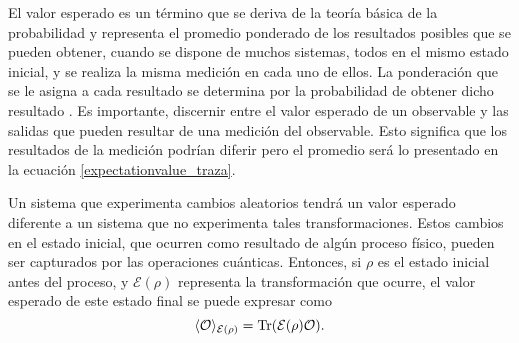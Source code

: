El valor esperado es un término que se deriva de la teoría básica de la probabilidad y representa el promedio ponderado de los resultados posibles que se pueden obtener, cuando se dispone de muchos sistemas, todos en el mismo estado inicial, y se realiza la misma medición en cada uno de ellos. La ponderación que se le asigna a cada resultado se determina por la probabilidad de obtener dicho resultado {\cite{gomez2010introduccion,sakurai2017modern}}.
Es importante, discernir entre el valor esperado de un observable y las salidas que pueden resultar de una medición del observable. Esto significa que los resultados de la medición podrían diferir pero el promedio será lo presentado en la ecuación {\eqref{expectationvalue_traza}}. 





Un sistema que experimenta cambios aleatorios tendrá un valor esperado diferente a un sistema que no experimenta tales transformaciones. Estos cambios en el estado inicial, que ocurren como resultado de algún proceso físico, pueden ser capturados por las operaciones cuánticas. Entonces, si $\rho$ es el estado inicial antes del proceso, y $\mathcal{E}(\rho)$ representa la transformación que ocurre, el valor esperado de este estado final se puede expresar como
\begin{equation}\label{eq:Expected-Value-Op-Cuanticas}
    \langle \mathcal{O}\rangle_{\mathcal{E}(\rho)}={\rm Tr}(\mathcal{E}(\rho)\mathcal{O}).
\end{equation} 


